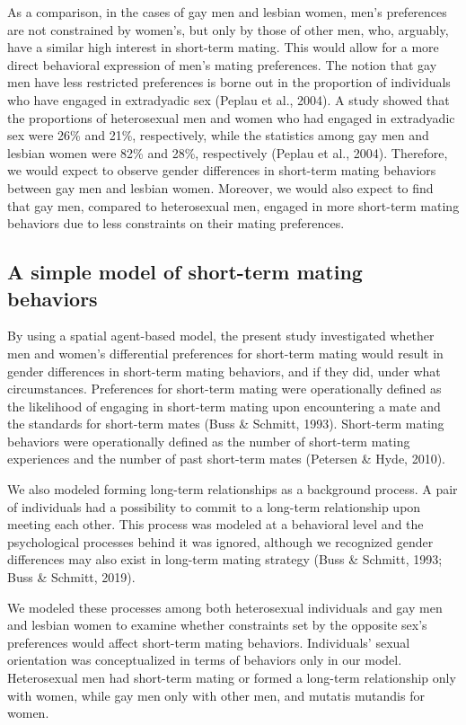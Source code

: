 \documentclass[
  11pt,
]{article}
\begin{document}
As a comparison, in the cases of gay men and lesbian women, men's
preferences are not constrained by women's, but only by those of other
men, who, arguably, have a similar high interest in short-term mating.
This would allow for a more direct behavioral expression of men's mating
preferences. The notion that gay men have less restricted preferences is
borne out in the proportion of individuals who have engaged in
extradyadic sex (Peplau et al., 2004). A study showed that the
proportions of heterosexual men and women who had engaged in extradyadic
sex were 26\% and 21\%, respectively, while the statistics among gay men
and lesbian women were 82\% and 28\%, respectively (Peplau et al.,
2004). Therefore, we would expect to observe gender differences in
short-term mating behaviors between gay men and lesbian women. Moreover,
we would also expect to find that gay men, compared to heterosexual men,
engaged in more short-term mating behaviors due to less constraints on
their mating preferences.

\hypertarget{a-simple-model-of-short-term-mating-behaviors}{%
\subsection{A simple model of short-term mating
behaviors}\label{a-simple-model-of-short-term-mating-behaviors}}

By using a spatial agent-based model, the present study investigated
whether men and women's differential preferences for short-term mating
would result in gender differences in short-term mating behaviors, and
if they did, under what circumstances. Preferences for short-term mating
were operationally defined as the likelihood of engaging in short-term
mating upon encountering a mate and the standards for short-term mates
(Buss \& Schmitt, 1993). Short-term mating behaviors were operationally
defined as the number of short-term mating experiences and the number of
past short-term mates (Petersen \& Hyde, 2010).

We also modeled forming long-term relationships as a background process.
A pair of individuals had a possibility to commit to a long-term
relationship upon meeting each other. This process was modeled at a
behavioral level and the psychological processes behind it was ignored,
although we recognized gender differences may also exist in long-term
mating strategy (Buss \& Schmitt, 1993; Buss \& Schmitt, 2019).

We modeled these processes among both heterosexual individuals and gay
men and lesbian women to examine whether constraints set by the opposite
sex's preferences would affect short-term mating behaviors. Individuals'
sexual orientation was conceptualized in terms of behaviors only in our
model. Heterosexual men had short-term mating or formed a long-term
relationship only with women, while gay men only with other men, and
mutatis mutandis for women.
\end{document}

